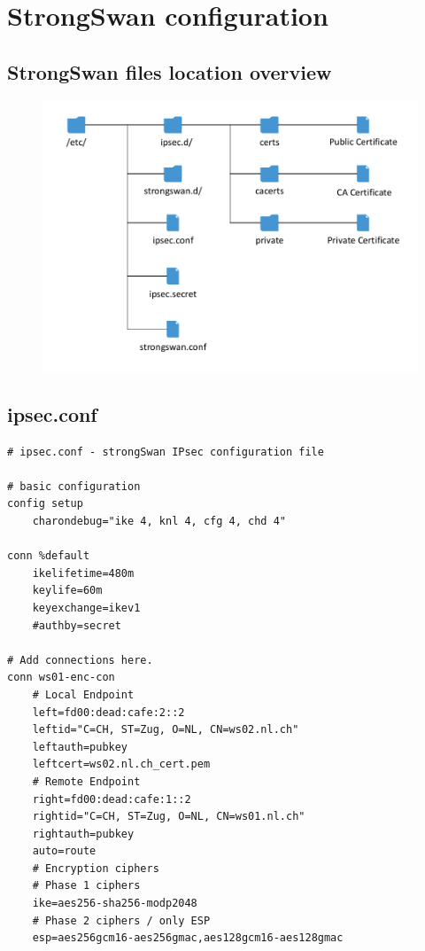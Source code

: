 \documentclass[a4paper]{report}
\begin{document}
\chapter{StrongSwan configuration}
\label{app-ch:StrongSwan}

\section{StrongSwan files location overview}
\begin{figure}[h!]
	\label{fig:StrongSwanFiles}
	\includegraphics[keepaspectratio,width=\textwidth]{StrongSwan_Files.pdf}
\end{figure}

\newpage

\section{ipsec.conf}
\label{app-sec:ipsec.conf-P2P}
\begin{lstlisting}
# ipsec.conf - strongSwan IPsec configuration file

# basic configuration
config setup
    charondebug="ike 4, knl 4, cfg 4, chd 4"

conn %default
    ikelifetime=480m
    keylife=60m
    keyexchange=ikev1
    #authby=secret

# Add connections here.
conn ws01-enc-con
    # Local Endpoint
    left=fd00:dead:cafe:2::2
    leftid="C=CH, ST=Zug, O=NL, CN=ws02.nl.ch"
    leftauth=pubkey
    leftcert=ws02.nl.ch_cert.pem
    # Remote Endpoint
    right=fd00:dead:cafe:1::2
    rightid="C=CH, ST=Zug, O=NL, CN=ws01.nl.ch"
    rightauth=pubkey
    auto=route
    # Encryption ciphers
    # Phase 1 ciphers
    ike=aes256-sha256-modp2048
    # Phase 2 ciphers / only ESP
    esp=aes256gcm16-aes256gmac,aes128gcm16-aes128gmac
\end{lstlisting}
\end{document}
